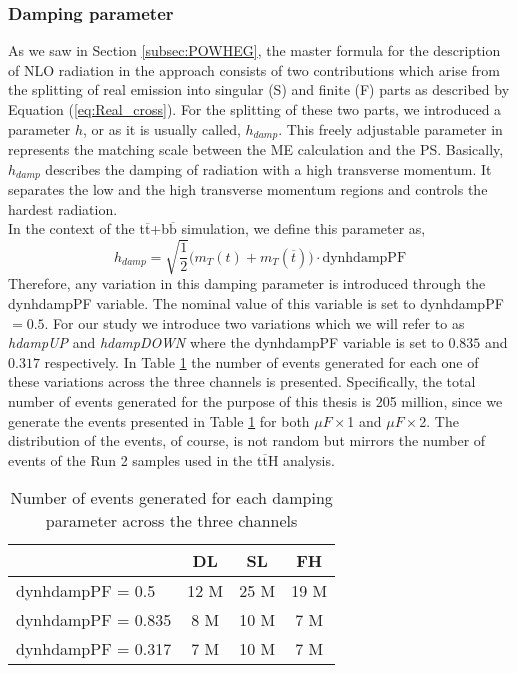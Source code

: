 \subsubsection{Damping parameter}
\noindent As we saw in Section \ref{subsec:POWHEG}, the master formula for the description of NLO radiation in the {\selectfont{Powheg}} approach consists of two contributions which arise from the splitting of real emission into singular (S) and finite (F) parts as described by Equation (\ref{eq:Real_cross}). For the splitting of these two parts, we introduced a parameter $h$, or as it is usually called, $h_{damp}$. This freely adjustable parameter in {\selectfont{Powheg}} represents the matching scale between the ME calculation and the PS. Basically, $h_{damp}$ describes the damping of radiation with a high transverse momentum. It separates the low and the high transverse momentum regions and controls the hardest radiation. \\
\indent In the context of the t$\overline{\text{t}}$+b$\overline{\text{b}}$ simulation, we define this parameter as,
\begin{equation}
    h_{damp} = \sqrt{\frac{1}{2}}\big(m_T(t) + m_T(\overline{t})\big)\cdot \text{dynhdampPF}
\end{equation}
Therefore, any variation in this damping parameter is introduced through the dynhdampPF variable. The nominal value of this variable is set to dynhdampPF  $= 0.5$. For our study we introduce two variations which we will refer to as \textit{hdampUP} and \textit{hdampDOWN} where the dynhdampPF variable is set to $0.835$ and $0.317$ respectively. In Table \ref{tab:number of events} the number of events generated for each one of these variations across the three channels is presented. Specifically, the total number of events generated for the purpose of this thesis is 205 million, since we generate the events presented in Table \ref{tab:number of events} for both $\mu F\times$1 and $\mu F\times$2. The distribution of the events, of course, is not random but mirrors the number of events of the Run 2 samples used in the t$\overline{\text{t}}$H analysis.

\begin{table}[H]
\centering
\caption{Number of events generated for each damping parameter across the three channels}
\label{tab:number of events}
\begin{tabular}{l|ccc}
                   & DL   & SL   & FH   \\ \hline
dynhdampPF = 0.5   & 12 M & 25 M & 19 M \\
dynhdampPF = 0.835 & 8 M  & 10 M & 7 M  \\
dynhdampPF = 0.317 & 7 M  & 10 M & 7 M 
\end{tabular}
\end{table}
